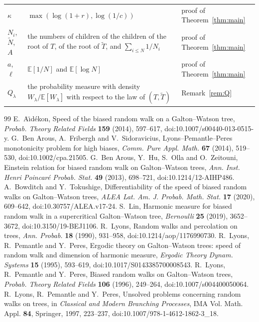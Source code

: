 \documentclass[11pt]{amsart}
\theoremstyle{definition}
\newcommand{\E}{\mathbb{E}}
\begin{document}
{\begin{longtable}{@{}lp{}p{}@{}}
$\kappa$ & $\max(\log(1+r),\log(1/c))$ & proof of Theorem~\ref{thm:main}\\
$N_i$, $\tilde N$, $A$ & the numbers of children of the children of the root of $T$, of the root of $\tilde T$, and $\sum_{i\le N}1/N_i$ & proof of Theorem~\ref{thm:main}\\
$a$, $\ell$ & $\E[1/N]$ and $\E[\log N]$ & proof of Theorem~\ref{thm:main}\\
$Q_\lambda$ & the probability measure with density $W_\lambda/\E[W_\lambda]$ with respect to the law of $(T,\tilde T)$ & Remark~\ref{rem:Q}\\
\bottomrule\end{longtable}}

\begin{thebibliography}{99}
 E.~A\"{\i}d\'ekon, Speed of the biased random walk on a Galton--Watson tree,
\emph{Probab. Theory Related Fields} \textbf{159} (2014), 597--617, doi:10.1007/s00440-013-0515-y.
 G.~Ben Arous, A.~Fribergh and V.~Sidoravicius, Lyons--Pemantle--Peres monotonicity problem for high
biases, \emph{Comm. Pure Appl. Math.} \textbf{67} (2014), 519--530, doi:10.1002/cpa.21505.
 G.~Ben Arous, Y.~Hu, S.~Olla and O.~Zeitouni, Einstein relation for biased random walk on
Galton--Watson trees, \emph{Ann. Inst. Henri Poincar\'e Probab. Stat.} \textbf{49} (2013), 698--721, doi:10.1214/12-AIHP486.
 A.~Bowditch and Y.~Tokushige, Differentiability of the speed of biased random walks on
Galton--Watson trees, \emph{ALEA Lat. Am. J. Probab. Math. Stat.} \textbf{17} (2020), 609--642, doi:10.30757/ALEA.v17-24.
 S.~Lin, Harmonic measure for biased random walk in a supercritical Galton--Watson tree,
\emph{Bernoulli} \textbf{25} (2019), 3652--3672, doi:10.3150/19-BEJ1106.
 R.~Lyons, Random walks and percolation on trees, \emph{Ann. Probab.} \textbf{18} (1990),
931--958, doi:10.1214/aop/1176990730.
 R.~Lyons, R.~Pemantle and Y.~Peres, Ergodic theory on Galton--Watson trees: speed of random walk
and dimension of harmonic measure, \emph{Ergodic Theory Dynam. Systems} \textbf{15} (1995), 593--619, doi:10.1017/S0143385700008543.
 R.~Lyons, R.~Pemantle and Y.~Peres, Biased random walks on Galton--Watson trees,
\emph{Probab. Theory Related Fields} \textbf{106} (1996), 249--264, doi:10.1007/s004400050064.
 R.~Lyons, R.~Pemantle and Y.~Peres, Unsolved problems concerning random walks on trees, in
\emph{Classical and Modern Branching Processes}, IMA Vol. Math. Appl. \textbf{84}, Springer, 1997, 223--237, doi:10.1007/978-1-4612-1862-3\_18.

\end{thebibliography}
\end{document}

